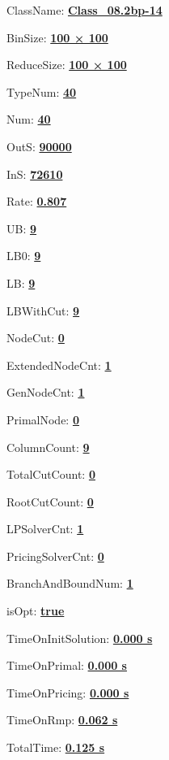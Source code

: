 \documentclass[11pt]{article}
\begin{document}
\pagestyle{empty}


ClassName: \underline{\textbf{Class_08.2bp-14}}
\par
BinSize: \underline{\textbf{100 × 100}}
\par
ReduceSize: \underline{\textbf{100 × 100}}
\par
TypeNum: \underline{\textbf{40}}
\par
Num: \underline{\textbf{40}}
\par
OutS: \underline{\textbf{90000}}
\par
InS: \underline{\textbf{72610}}
\par
Rate: \underline{\textbf{0.807}}
\par
UB: \underline{\textbf{9}}
\par
LB0: \underline{\textbf{9}}
\par
LB: \underline{\textbf{9}}
\par
LBWithCut: \underline{\textbf{9}}
\par
NodeCut: \underline{\textbf{0}}
\par
ExtendedNodeCnt: \underline{\textbf{1}}
\par
GenNodeCnt: \underline{\textbf{1}}
\par
PrimalNode: \underline{\textbf{0}}
\par
ColumnCount: \underline{\textbf{9}}
\par
TotalCutCount: \underline{\textbf{0}}
\par
RootCutCount: \underline{\textbf{0}}
\par
LPSolverCnt: \underline{\textbf{1}}
\par
PricingSolverCnt: \underline{\textbf{0}}
\par
BranchAndBoundNum: \underline{\textbf{1}}
\par
isOpt: \underline{\textbf{true}}
\par
TimeOnInitSolution: \underline{\textbf{0.000 s}}
\par
TimeOnPrimal: \underline{\textbf{0.000 s}}
\par
TimeOnPricing: \underline{\textbf{0.000 s}}
\par
TimeOnRmp: \underline{\textbf{0.062 s}}
\par
TotalTime: \underline{\textbf{0.125 s}}
\par
\newpage


\end{document}
